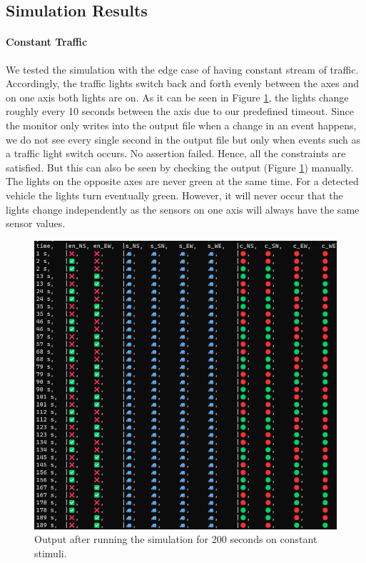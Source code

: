 \documentclass[10pt,bibliography=totocnumbered,listof=totocnumbered, footsepline, headsepline]{scrreprt}
\begin{document}
    \subsection{Simulation Results}\label{subsec:results}
    
    \paragraph*{Constant Traffic}
    We tested the simulation with the edge case of having constant stream of traffic. Accordingly, the traffic lights switch back and forth evenly between the axes and on one axis both lights are on. As it can be seen in Figure \ref{fig:constant_traffic}, the lights change roughly every 10 seconds between the axis due to our predefined timeout. Since the monitor only writes into the output file when a change in an event happens, we do not see every single second in the output file but only when events such as a traffic light switch occurs. No assertion failed. Hence, all the constraints are satisfied. But this can also be seen by checking the output (Figure \ref{fig:constant_traffic}) manually. The lights on the opposite axes are never green at the same time. For a detected vehicle the lights turn eventually green. However, it will never occur that the lights change independently as the sensors on one axis will always have the same sensor values.
    \begin{figure}[h]
    	\centerline{\includegraphics[width=34pc]{constant_traffic.png}}
    	\caption{Output after running the simulation for 200 seconds on constant stimuli.}
    	\label{fig:constant_traffic}
    \end{figure}
    
\end{document}
